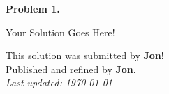 \documentclass[12pt]{article}
\begin{document}
	
	\textbf{Problem 1.\\}
	
	Your Solution Goes Here!
	
	\newpage
	\thispagestyle{empty}
	
	\begin{center}
		This solution was submitted by \textbf{Jon}!\\[4pt]
		Published and refined by \textbf{Jon}.\\[8pt]
		\textit{Last updated: \today}
	\end{center}
	
\end{document}
